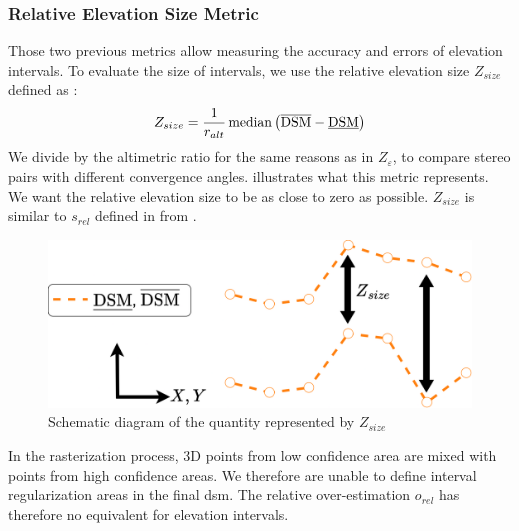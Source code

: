 \subsubsection{Relative Elevation Size Metric}
Those two previous metrics allow measuring the accuracy and errors of elevation intervals. To evaluate the size of intervals, we use the relative elevation size $Z_{size}$ defined as :
\begin{align}\label{eq:relative_size_elevation}
    Z_{size} = \dfrac{1}{r_{alt}}\operatorname*{median}\left(\overline{\mathrm{DSM}}-\underline{\mathrm{DSM}}\right)
\end{align}
We divide by the altimetric ratio for the same reasons as in $Z_\varepsilon$, \ie to compare stereo pairs with different convergence angles.  illustrates what this metric represents. We want the relative elevation size to be as close to zero as possible. $Z_{size}$ is similar to $s_{rel}$ defined in  from .

\begin{figure}
    \centering
    \includegraphics[width=0.7\linewidth]{Images/Chap_6/Intervals_elevation_metrics_Z_size.png}
    \caption{Schematic diagram of the quantity represented by $Z_{size}$}
    \label{fig:Intervals_elevation_metrics_Z_size}
\end{figure}

\begin{remark}
    In the rasterization process, 3D points from low confidence area are mixed with points from high confidence areas. We therefore are unable to define interval regularization areas in the final \acrshort{dsm}. The relative over-estimation $o_{rel}$ has therefore no equivalent for elevation intervals.  
\end{remark}

